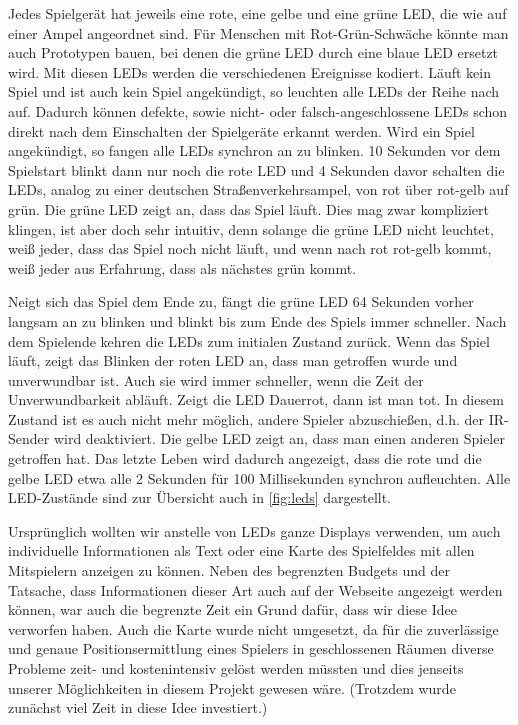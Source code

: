 Jedes Spielgerät hat jeweils eine rote, eine gelbe und eine grüne LED, die wie auf einer Ampel
angeordnet sind.
Für Menschen mit Rot-Grün-Schwäche könnte man auch Prototypen bauen, bei denen die grüne LED durch
eine blaue LED ersetzt wird.
Mit diesen LEDs werden die verschiedenen Ereignisse kodiert.
Läuft kein Spiel und ist auch kein Spiel angekündigt, so leuchten alle LEDs der Reihe nach auf.
Dadurch können defekte, sowie nicht- oder falsch-angeschlossene LEDs schon direkt nach dem
Einschalten der Spielgeräte erkannt werden.
Wird ein Spiel angekündigt, so fangen alle LEDs synchron an zu blinken.
10 Sekunden vor dem Spielstart blinkt dann nur noch die rote LED und 4 Sekunden davor schalten die
LEDs, analog zu einer deutschen Straßenverkehrsampel, von rot über rot-gelb auf grün.
Die grüne LED zeigt an, dass das Spiel läuft.
Dies mag zwar kompliziert klingen, ist aber doch sehr intuitiv, denn solange die grüne LED nicht
leuchtet, weiß jeder, dass das Spiel noch nicht läuft, und wenn nach rot rot-gelb kommt, weiß jeder
aus Erfahrung, dass als nächstes grün kommt.

Neigt sich das Spiel dem Ende zu, fängt die grüne LED 64 Sekunden vorher langsam an zu blinken und
blinkt bis zum Ende des Spiels immer schneller.
Nach dem Spielende kehren die LEDs zum initialen Zustand zurück.
Wenn das Spiel läuft, zeigt das Blinken der roten LED an, dass man getroffen wurde und unverwundbar
ist.
Auch sie wird immer schneller, wenn die Zeit der Unverwundbarkeit abläuft.
Zeigt die LED Dauerrot, dann ist man tot.
In diesem Zustand ist es auch nicht mehr möglich, andere Spieler abzuschießen, d.h. der IR-Sender
wird deaktiviert.
Die gelbe LED zeigt an, dass man einen anderen Spieler getroffen hat.
Das letzte Leben wird dadurch angezeigt, dass die rote und die gelbe LED etwa alle 2 Sekunden für
100 Millisekunden synchron aufleuchten.
Alle LED-Zustände sind zur Übersicht auch in \cref{fig:leds} dargestellt.

Ursprünglich wollten wir anstelle von LEDs ganze Displays verwenden, um auch individuelle
Informationen als Text oder eine Karte des Spielfeldes mit allen Mitspielern anzeigen zu können.
Neben des begrenzten Budgets und der Tatsache, dass Informationen dieser Art auch auf der Webseite
angezeigt werden können, war auch die begrenzte Zeit ein Grund dafür, dass wir diese Idee verworfen
haben.
Auch die Karte wurde nicht umgesetzt, da für die zuverlässige und genaue Positionsermittlung eines
Spielers in geschlossenen Räumen diverse Probleme zeit- und kostenintensiv gelöst werden müssten und
dies jenseits unserer Möglichkeiten in diesem Projekt gewesen wäre.
(Trotzdem wurde zunächst viel Zeit in diese Idee investiert.)
